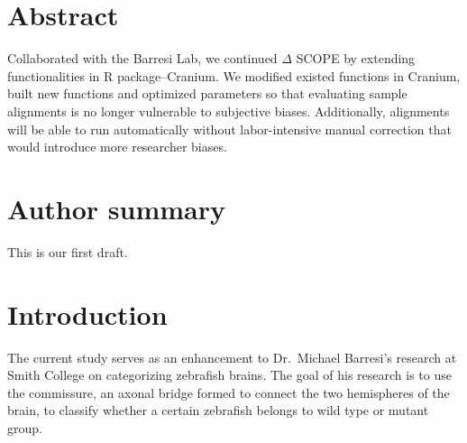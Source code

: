 \documentclass[10pt,letterpaper]{article}
\newcommand{\getIndex}[2]{
  \ForEach{,}{\IfEq{#1}{\thislevelitem}{\number\thislevelcount\ExitForEach}{}}{#2}
}
\newcommand{\getAff}[1]{
  \getIndex{#1}{}
}
\begin{document}
\vspace*{0.2in}

\section*{Abstract}
Collaborated with the Barresi Lab, we continued \(\Delta\) SCOPE by
extending functionalities in R package--Cranium. We modified existed
functions in Cranium, built new functions and optimized parameters so
that evaluating sample alignments is no longer vulnerable to subjective
biases. Additionally, alignments will be able to run automatically
without labor-intensive manual correction that would introduce more
researcher biases.

\section*{Author summary}
This is our first draft.

\linenumbers

\hypertarget{introduction}{%
\section{Introduction}\label{introduction}}

The current study serves as an enhancement to Dr.~Michael Barresi's
research at Smith College on categorizing zebrafish brains. The goal of
his research is to use the commissure, an axonal bridge formed to
connect the two hemispheres of the brain, to classify whether a certain
zebrafish belongs to wild type or mutant group.
\end{document}
